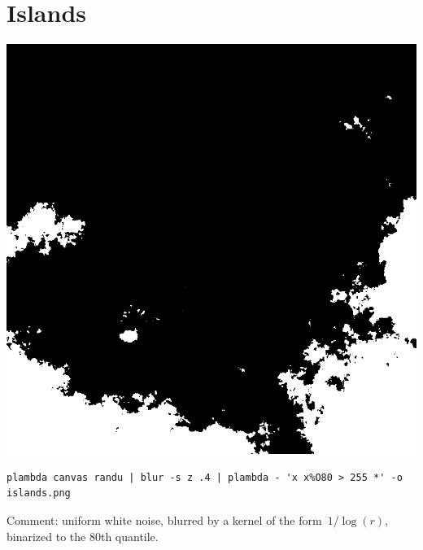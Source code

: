 \section{Islands}
\includegraphics{islands.png}
\begin{verbatim}
plambda canvas randu | blur -s z .4 | plambda - 'x x%O80 > 255 *' -o islands.png
\end{verbatim}
Comment: uniform white noise, blurred by a kernel of the form~$1/\log(r)$,
binarized to the 80th quantile.


